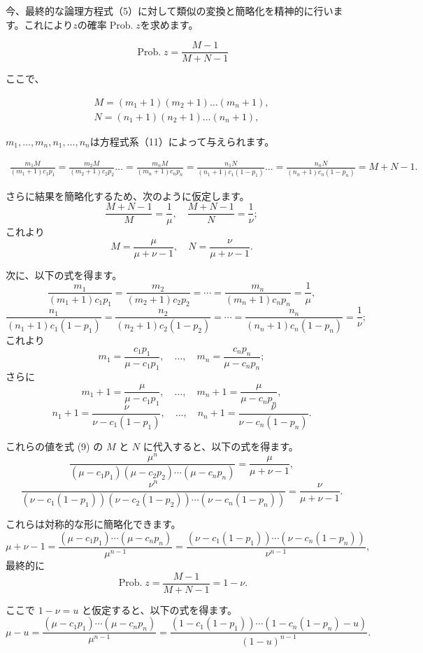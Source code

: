 \documentclass[a4paper,11pt,openany]{ltjsbook}
\begin{document}
今、最終的な論理方程式（5）に対して類似の変換と簡略化を精神的に行います。これにより$z$の確率$\operatorname{Prob. } z$を求めます。

$$
\operatorname{Prob. } z = \frac{M-1}{M+N-1}
$$

ここで、

\[
\begin{gathered}
M=(m_1 + 1) (m_2 + 1)\dotsc (m_n + 1), \\
N = (n_1 + 1) (n_2 + 1)\dotsc (n_n + 1),
\end{gathered}
\]

$m_1, \dotsc, m_n, n_1,\dotsc,n_n$は方程式系（11）によって与えられます。

\[
\begin{split}
\frac{m_1 M}{(m_1 + 1) c_1 p_1} = \frac{m_2 M}{(m_2 + 1) c_2 p_2} \dotso = \frac{m_n M}{(m_n + 1) c_n p_n}
= \frac{n_1 N}{(n_1 + 1)c_1 (1-p_1)}\dotso
= \frac{n_n N}{(n_n+1)c_n(1-p_n)}
=M+N-1.
\end{split}
\]

さらに結果を簡略化するため、次のように仮定します。
\[
\frac{M+N-1}{M} = \frac{1}{\mu}, \quad \frac{M+N-1}{N} = \frac{1}{\nu};
\]
これより
\[
M = \frac{\mu}{\mu + \nu - 1}, \quad N = \frac{\nu}{\mu + \nu - 1}.
\]

次に、以下の式を得ます。
\[
\frac{m_1}{(m_1+1)c_1 p_1} = \frac{m_2}{(m_2+1)c_2 p_2} = \cdots = \frac{m_n}{(m_n+1)c_n p_n} = \frac{1}{\mu},
\]
\[
\frac{n_1}{(n_1+1)c_1(1-p_1)} = \frac{n_2}{(n_2+1)c_2(1-p_2)} = \cdots = \frac{n_n}{(n_n+1)c_n(1-p_n)} = \frac{1}{\nu};
\]
これより
\[
m_1 = \frac{c_1 p_1}{\mu - c_1 p_1}, \quad \dotsc, \quad m_n = \frac{c_n p_n}{\mu - c_n p_n};
\]
さらに
\[
m_1 + 1 = \frac{\mu}{\mu - c_1 p_1}, \quad \dotsc, \quad m_n + 1 = \frac{\mu}{\mu - c_n p_n},
\]
\[
n_1 + 1 = \frac{\nu}{\nu - c_1(1-p_1)}, \quad \dotsc, \quad n_n + 1 = \frac{\nu}{\nu - c_n(1-p_n)}.
\]

これらの値を式 (9) の $M$ と $N$ に代入すると、以下の式を得ます。
\[
\frac{\mu^n}{(\mu - c_1 p_1)(\mu - c_2 p_2) \cdots (\mu - c_n p_n)} = \frac{\mu}{\mu + \nu - 1},
\]
\[
\frac{\nu^n}{(\nu - c_1(1-p_1))(\nu - c_2(1-p_2)) \cdots (\nu - c_n(1-p_n))} = \frac{\nu}{\mu + \nu - 1}.
\]

これらは対称的な形に簡略化できます。
\[
\mu + \nu - 1 = \frac{(\mu - c_1 p_1) \cdots (\mu - c_n p_n)}{\mu^{n-1}} = \frac{(\nu - c_1(1-p_1)) \cdots (\nu - c_n(1-p_n))}{\nu^{n-1}},
\]
最終的に
\[
\operatorname{Prob.} z = \frac{M-1}{M+N-1} = 1 - \nu.
\]

ここで $1 - \nu = u$ と仮定すると、以下の式を得ます。
\[
\mu - u = \frac{(\mu - c_1 p_1) \cdots (\mu - c_n p_n)}{\mu^{n-1}} = \frac{(1 - c_1(1-p_1)) \cdots (1 - c_n(1-p_n) - u)}{(1-u)^{n-1}}.
\]
\end{document}
